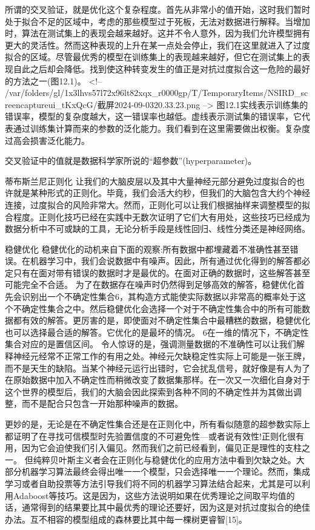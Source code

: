 所谓的交叉验证，就是优化这个复杂程度。首先从非常小的值开始，这时我们暂时处于拟合不足的区域中，考虑的那些模型过于死板，无法对数据进行解释。当增加时，算法在测试集上的表现会越来越好。这并不令人意外，因为我们允许模型拥有更大的灵活性。然而这种表现的上升在某一点处会停止，我们在这里就进入了过度拟合的区域。尽管最优秀的模型在训练集上的表现越来越好，但它在测试集上的表现自此之后却会降低。找到使这种转变发生的值正是对抗过度拟合这一危险的最好的方法之一(图12.1)。
<!-- /var/folders/gl/1x3lhvs57l72x96lt82xqx_r0000gp/T/TemporaryItems/NSIRD_screencaptureui_tKxQcG/截屏2024-09-0320.33.23.png -->
图12.1实线表示训练集的错误率，模型的复杂度越大，这一错误率也越低。虚线表示测试集的错误率，它代表通过训练集计算而来的参数的泛化能力。我们看到在这里需要做出权衡。复杂度过高会损害泛化能力。

交叉验证中的值就是数据科学家所说的“超参数”(hyperparameter)。

蒂布斯兰尼正则化
让我们的大脑皮层以及其中大量神经元部分避免过度拟合的也许就是某种形式的正则化。毕竟，我们会活大约秒，但我们的大脑包含大约个神经连接，过度拟合的风险非常大。然而，正则化可以让我们根据抽样来调整模型的拟合程度。正则化技巧已经在实践中无数次证明了它们大有用处，这些技巧已经成为数据分析中不可或缺的工具，无论分析手段是线性回归、线性分类还是神经网络。

稳健优化
稳健优化的动机来自下面的观察:所有数据中都埋藏着不准确性甚至错误。在机器学习中，我们会说数据中有噪声。因此，所有通过优化得到的解答都必定只有在面对带有错误的数据时才是最优的。在面对正确的数据时，这些解答甚至可能完全不合适。
为了在数据存在噪声时仍然得到足够高效的解答，稳健优化首先会识别出一个不确定性集合6，其构造方式能使实际数据以非常高的概率处于这个不确定性集合之中。然后稳健优化会选择一个对于不确定性集合中的所有可能数据都有效的解答。更厉害的是，即使面对不确定性集合中最糟糕的数据，稳健优化也可以选择最合适的解答。它优化的是最坏的情况。
6在一维的情况下，不确定性集合对应的是置信区间。
令人惊讶的是，强调测量数据的不准确性可以让我们解释神经元经常不正常工作的有用之处。神经元欠缺稳定性实际上可能是一张王牌，而不是天生的缺陷。当某个神经元运行出错时，它会扰乱信号，就好像是有人为了在原始数据中加入不确定性而稍微改变了数据集那样。在一次又一次细化自身对于这个世界的模型后，我们的大脑会因此探索到各种不同的不确定性并为其做出调整，而不是配合只包含一开始那种噪声的数据。

更妙的是，无论是在不确定性集合还是在正则化中，所有看似随意的超参数实际上都证明了在寻找可信模型时先验置信度的不可避免性---或者说有效性!正则化很有用，因为它会迫使我们引入偏见。然而我们之前已经看到，偏见正是理性的支柱之一。
但纯粹贝叶斯主义者会在正则化与稳健优化的应用方法中看到欠缺之处。大部分机器学习算法最终会得出唯一一个模型，只会选择唯一一个理论。然而，集成学习或者自助投票等方法引导我们将不同的机器学习算法结合起来，尤其是可以利用Adaboost等技巧。这是因为，这些方法说明如果在优秀理论之间取平均值的话，通常得到的结果要比其中最优秀的理论还要好，因为这是对抗过度拟合的绝佳办法。互不相容的模型组成的森林要比其中每一棵树更睿智[15]。

